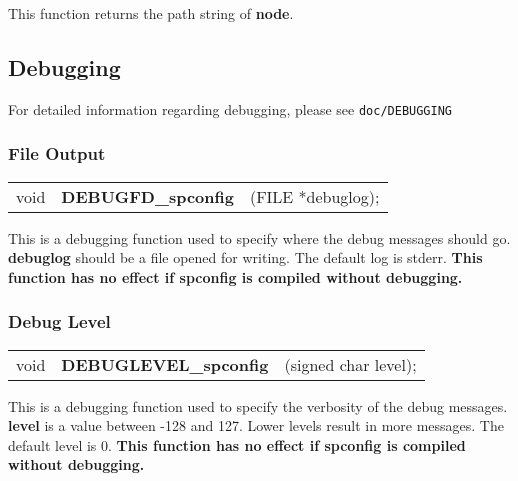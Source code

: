 \documentclass[10pt]{article}
\begin{document}
\noindent This function returns the path string of \textbf{node}.\\



\subsection{Debugging}

For detailed information regarding debugging, please see {\tt doc/DEBUGGING}

\subsubsection*{File Output}
\noindent\begin{tabular}{l l l @{}}
void&\textbf{DEBUGFD\_spconfig}&(FILE *debuglog);\\
\end{tabular}

\noindent This is a debugging function used to specify where the debug messages
should go. \textbf{debuglog} should be a file opened for writing.  The default
log is stderr. \textbf{This function has no effect if spconfig is compiled
without debugging.}

\subsubsection*{Debug Level}
\noindent\begin{tabular}{l l l @{}}
void&\textbf{DEBUGLEVEL\_spconfig}&(signed char level);\\
\end{tabular}

\noindent This is a debugging function used to specify the verbosity of the
debug messages.  \textbf{level} is a value between -128 and 127.  Lower levels
result in more messages.  The default level is 0. \textbf{This function has no
effect if spconfig is compiled without debugging.}
\end{document}
